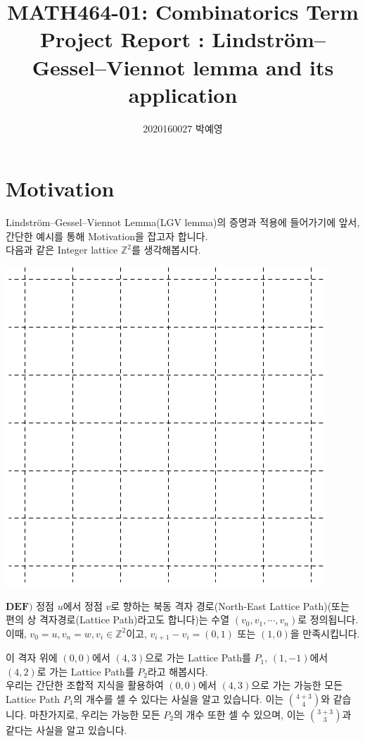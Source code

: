 \documentclass[a4paper]{article}
\title{MATH464-01: Combinatorics Term Project Report : Lindström–Gessel–Viennot lemma and its application}
\author{2020160027 박예영}
\date{}
\begin{document}
\maketitle
\section{Motivation}
Lindström–Gessel–Viennot Lemma(LGV lemma)의 증명과 적용에 들어가기에 앞서, 간단한 예시를 통해 Motivation을 잡고자 합니다.\\
다음과 같은 Integer lattice $\mathbb{Z}^2$를 생각해봅시다.\\
\begin{center}
\includegraphics[scale=0.5]{image1.png}
\end{center}
\begin{mdframed}
$\mathbf{DEF)}$ 정점 $u$에서 정점 $v$로 향하는 북동 격자 경로(North-East Lattice Path)(또는 편의 상 격자경로(Lattice Path)라고도 합니다)는 수열 $(v_0, v_1, \cdots, v_n)$로 정의됩니다.\\ 이때, $v_0 = u, v_n = w, v_i \in \mathbb{Z}^2$이고, $v_{i+1} - v_i = (0,1)$ 또는 $(1,0)$을 만족시킵니다.
\end{mdframed}
이 격자 위에 $(0, 0)$에서 $(4, 3)$으로 가는 Lattice Path를 $P_1$, $(1,-1)$에서 $(4,2)$로 가는 Lattice Path를 $P_2$라고 해봅시다.\\
우리는 간단한 조합적 지식을 활용하여 $(0, 0)$에서 $(4, 3)$으로 가는 가능한 모든 Lattice Path $P_1$의 개수를 셀 수 있다는 사실을 알고 있습니다. 이는 $\binom{4+3}{4}$와 같습니다. 마찬가지로, 우리는 가능한 모든 $P_2$의 개수 또한 셀 수 있으며, 이는 $\binom{3+3}{3}$과 같다는 사실을 알고 있습니다.\\
\end{document}
